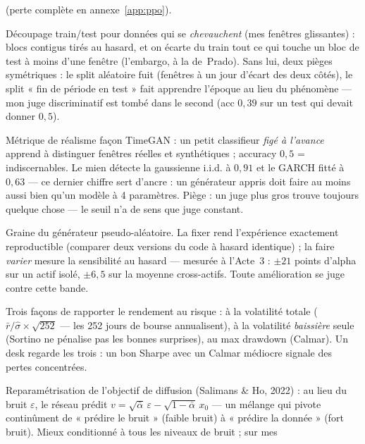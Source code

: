 \documentclass[11pt,a4paper]{article}
\begin{document}
\begin{description}[itemsep=4pt, font=\normalfont\bfseries]
        (perte complète en annexe~\ref{app:ppo}).
  \item[Purged split (embargo)] Découpage train/test pour données qui se
        \emph{chevauchent} (mes fenêtres glissantes) : blocs contigus tirés au hasard,
        et on écarte du train tout ce qui touche un bloc de test à moins d'une fenêtre
        (l'embargo, à la de~Prado). Sans lui, deux pièges symétriques : le split
        aléatoire fuit (fenêtres à un jour d'écart des deux côtés), le split « fin de
        période en test » fait apprendre l'époque au lieu du phénomène --- mon juge
        discriminatif est tombé dans le second (acc $0{,}39$ sur un test qui devait
        donner $0{,}5$).
  \item[Score discriminatif] Métrique de réalisme façon TimeGAN : un petit classifieur
        \emph{figé à l'avance} apprend à distinguer fenêtres réelles et synthétiques ;
        accuracy $0{,}5$ = indiscernables. Le mien détecte la gaussienne i.i.d. à
        $0{,}91$ et le GARCH fitté à $0{,}63$ --- ce dernier chiffre sert d'ancre : un
        générateur appris doit faire au moins aussi bien qu'un modèle à 4 paramètres.
        Piège : un juge plus gros trouve toujours quelque chose --- le seuil n'a de
        sens que juge constant.
  \item[Seed] Graine du générateur pseudo-aléatoire. La fixer rend l'expérience
        exactement reproductible (comparer deux versions du code à hasard identique) ;
        la faire \emph{varier} mesure la sensibilité au hasard --- mesurée à
        l'Acte~3 : $\pm 21$ points d'alpha sur un actif isolé, $\pm 6{,}5$ sur la
        moyenne cross-actifs. Toute amélioration se juge contre cette bande.
  \item[Sharpe / Sortino / Calmar] Trois façons de rapporter le rendement au risque :
        à la volatilité totale ($\bar r / \hat\sigma \times \sqrt{252}$ --- les 252
        jours de bourse annualisent), à la volatilité \emph{baissière} seule (Sortino
        ne pénalise pas les bonnes surprises), au max drawdown (Calmar). Un desk
        regarde les trois : un bon Sharpe avec un Calmar médiocre signale des pertes
        concentrées.
  \item[v-prediction] Reparamétrisation de l'objectif de diffusion (Salimans \& Ho,
        2022) : au lieu du bruit $\varepsilon$, le réseau prédit
        $v = \sqrt{\bar\alpha}\,\varepsilon - \sqrt{1-\bar\alpha}\,x_0$ --- un mélange
        qui pivote continûment de « prédire le bruit » (faible bruit) à « prédire la
        donnée » (fort bruit). Mieux conditionné à tous les niveaux de bruit ; sur mes

\end{description}
\end{document}
